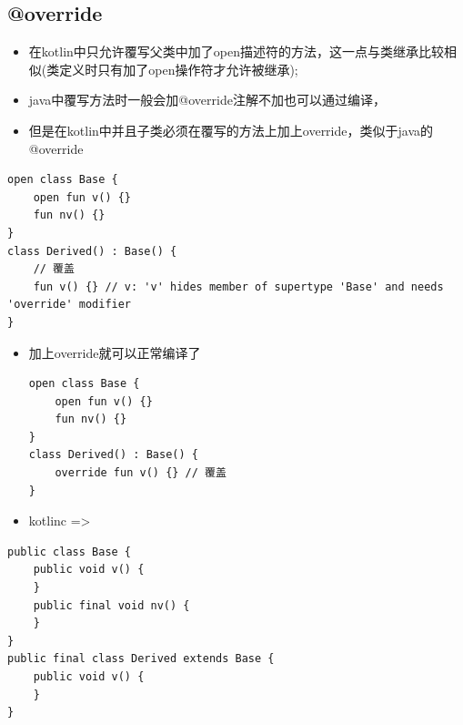 \documentclass[9pt, b5paper]{article}
\begin{document}
\subsection{@override}
\label{sec-7-3}
\begin{itemize}
\item 在kotlin中只允许覆写父类中加了open描述符的方法，这一点与类继承比较相似(类定义时只有加了open操作符才允许被继承);
\item java中覆写方法时一般会加@override注解不加也可以通过编译，
\item 但是在kotlin中并且子类必须在覆写的方法上加上override，类似于java的@override
\end{itemize}
\begin{verbatim}
open class Base {
    open fun v() {}
    fun nv() {}
}
class Derived() : Base() {
    // 覆盖
    fun v() {} // v: 'v' hides member of supertype 'Base' and needs 'override' modifier
}
\end{verbatim}
\begin{itemize}
\item 加上override就可以正常编译了
\begin{verbatim}
open class Base {
    open fun v() {}
    fun nv() {}
}
class Derived() : Base() {
    override fun v() {} // 覆盖
}
\end{verbatim}
\item kotlinc =>
\end{itemize}
\begin{verbatim}
public class Base {
    public void v() {
    }
    public final void nv() {
    }
}
public final class Derived extends Base {
    public void v() {
    }
}
\end{verbatim}
\end{document}
